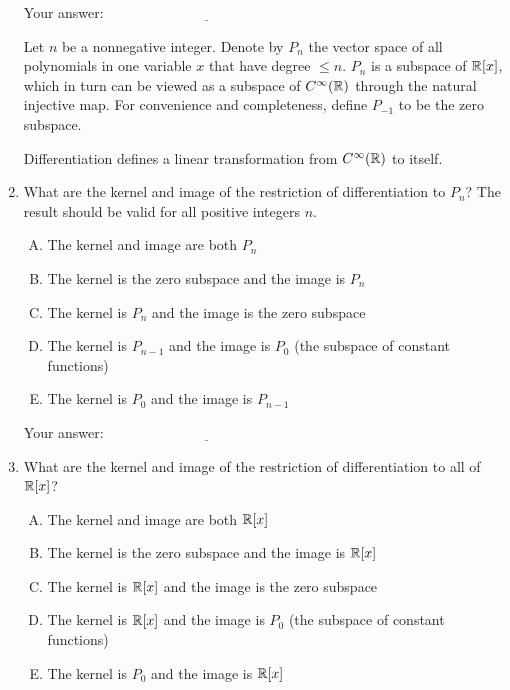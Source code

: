 \documentclass[10pt]{amsart}
\begin{document}
\begin{enumerate}
  \vspace{0.1in}
  Your answer: $\underline{\qquad\qquad\qquad\qquad\qquad\qquad\qquad}$
  \vspace{0.1in}

  Let $n$ be a nonnegative integer. Denote by $P_n$ the vector space
  of all polynomials in one variable $x$ that have degree $\le
  n$. $P_n$ is a subspace of $\mathbb{R}[x]$, which in turn can be viewed as a
  subspace of $C^\infty(\mathbb{R})$ through the natural injective map. For
  convenience and completeness, define $P_{-1}$ to be the zero
  subspace.

  Differentiation defines a linear transformation from
  $C^\infty(\mathbb{R})$ to itself.

\item What are the kernel and image of the restriction of
  differentiation to $P_n$? The result should be valid for all
  positive integers $n$.
 
  \begin{enumerate}[(A)]
  \item The kernel and image are both $P_n$
  \item The kernel is the zero subspace and the image is $P_n$
  \item The kernel is $P_n$ and the image is the zero subspace
  \item The kernel is $P_{n-1}$ and the image is $P_0$ (the subspace
    of constant functions)
  \item The kernel is $P_0$ and the image is $P_{n-1}$
  \end{enumerate}
  
  \vspace{0.1in}
  Your answer: $\underline{\qquad\qquad\qquad\qquad\qquad\qquad\qquad}$
  \vspace{0.1in}

\item What are the kernel and image of the restriction of
  differentiation to all of $\mathbb{R}[x]$?

  \begin{enumerate}[(A)]
  \item The kernel and image are both $\mathbb{R}[x]$
  \item The kernel is the zero subspace and the image is $\mathbb{R}[x]$
  \item The kernel is $\mathbb{R}[x]$ and the image is the zero subspace
  \item The kernel is $\mathbb{R}[x]$ and the image is $P_0$ (the subspace
    of constant functions)
  \item The kernel is $P_0$ and the image is $\mathbb{R}[x]$
  \end{enumerate}
  

\end{enumerate}
\end{document}
